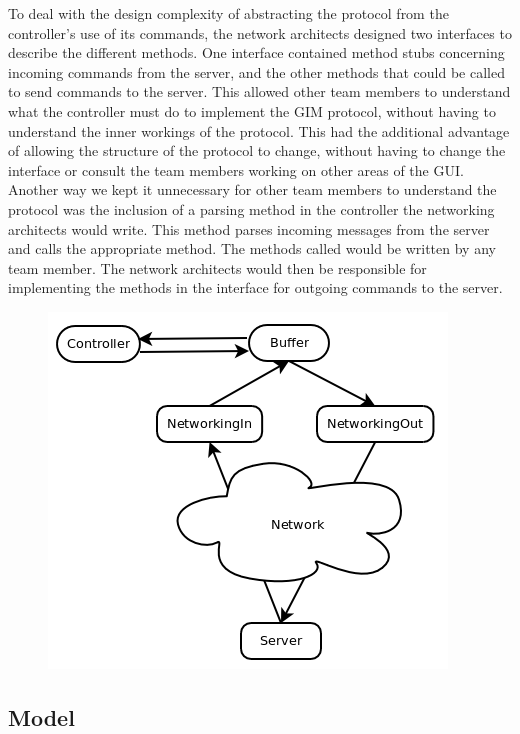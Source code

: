 To deal with the design complexity of abstracting the protocol from the controller's use of its commands, the network architects designed two interfaces to describe the different methods. One interface contained method stubs concerning incoming commands from the server, and the other methods that could be called to send commands to the server. This allowed other team members to understand what the controller must do to implement the GIM protocol, without having to understand the inner workings of the protocol. This had the additional advantage of allowing the structure of the protocol to change, without having to change the interface or consult the team members working on other areas of the GUI. Another way we kept it unnecessary for other team members to understand the protocol was the inclusion of a parsing method in the controller the networking architects would write. This method parses incoming messages from the server and calls the appropriate method. The methods called would be written by any team member. The network architects would then be responsible for implementing the methods in the interface for outgoing commands to the server.

\begin{figure}
    \begin{center}
        \includegraphics[scale=0.65]{Design/diagrams/buffer.png}
        \label{buffer}
    \end{center}
\end{figure}

\subsection {Model}
\label{model}

